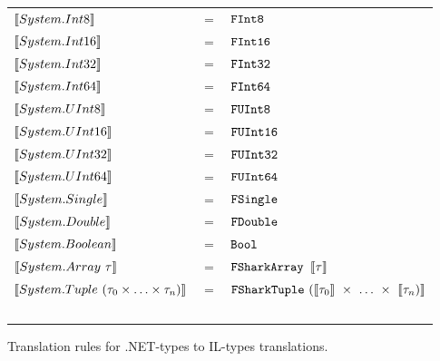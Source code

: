 \begin{figure}[H]
  \centering
\begin{tabular}{@{}l c l}%
  $\llbracket System.Int8 \rrbracket$ & $=$ & $\text{\ttfamily FInt8} $ \\ 
  $\llbracket System.Int16 \rrbracket$ & $=$ & $\text{\ttfamily FInt16}$
  \\
  $\llbracket System.Int32 \rrbracket$ & $=$ & $\text{\ttfamily FInt32} $ \\ 
  $\llbracket System.Int64 \rrbracket$ & $=$ & $\text{\ttfamily FInt64} $
  \\
  $\llbracket System.UInt8 \rrbracket$ & $=$ & $\text{\ttfamily FUInt8} $ \\ 
  $\llbracket System.UInt16 \rrbracket$ & $=$ & $\text{\ttfamily FUInt16} $ 
  \\
  $\llbracket System.UInt32 \rrbracket$ & $=$ & $\text{\ttfamily FUInt32} $ \\ 
  $\llbracket System.UInt64 \rrbracket$ & $=$ & $\text{\ttfamily FUInt64} $ 
  \\
  $\llbracket System.Single \rrbracket$ & $=$ & $\text{\ttfamily FSingle} $ \\ 
  $\llbracket System.Double \rrbracket$ & $=$ & $\text{\ttfamily FDouble} $ 
  \\
  $\llbracket System.Boolean \rrbracket$ & $=$ & $\text{\ttfamily Bool} $ \\ 
  $\llbracket System.Array~\tau \rrbracket$ & $=$ & $\text{\ttfamily {\texttt{FShark}}{}Array }\llbracket \tau \rrbracket$
  \\
  $\llbracket System.Tuple~(\tau_0 \times \ldots \times \tau_n) \rrbracket$ & $=$ & $\text{\ttfamily {\texttt{FShark}}{}Tuple}~(\llbracket \tau_0 \rrbracket~\times~\ldots~\times~\llbracket \tau_n) \rrbracket$ \\ ~ \\
\end{tabular}
\caption{Translation rules for .NET-types to \fshark{}IL-types translations.}
\label{fig:.nettofsharktypes}
\end{figure}

